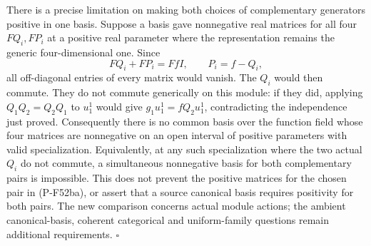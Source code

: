 \documentclass[11pt,a4paper]{article}
\begin{document}
There is a precise limitation on making both choices of
complementary generators positive in one basis. Suppose
a basis gave nonnegative real matrices for all four
$FQ_i,FP_i$ at a positive real parameter where the
representation remains the generic four-dimensional one.
Since
\[
             FQ_i+FP_i=FfI,\qquad P_i=f-Q_i,
                                                               \tag{P-F52bc}
\]
all off-diagonal entries of every matrix would vanish.
The $Q_i$ would then commute. They do not commute
generically on this module: if they did, applying
$Q_1Q_2=Q_2Q_1$ to $u_1^1$ would give
$g_1u_1^1=fQ_2u_1^1$, contradicting the independence
just proved. Consequently there is no common basis over
the function field whose four matrices are nonnegative
on an open interval of positive parameters with valid
specialization. Equivalently, at any such specialization
where the two actual $Q_i$ do not commute, a simultaneous
nonnegative basis for both complementary pairs is
impossible. This does not prevent the positive matrices
for the chosen pair in (P-F52ba), or assert that a source
canonical basis requires positivity for both pairs.
The new comparison concerns actual module actions;
the ambient canonical-basis, coherent categorical and
uniform-family questions remain additional requirements.
\hfill$\square$
\end{document}
